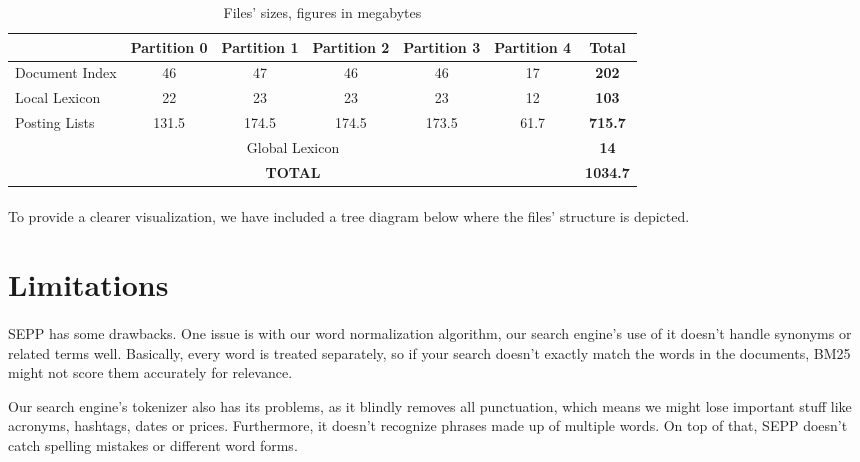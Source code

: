 \begin{table}[H]
	\centering
	\begin{tabular}{|l|*{5}{c|}c|}
		\hline
		& \textbf{Partition 0} & \textbf{Partition 1} & \textbf{Partition 2} & \textbf{Partition 3} & \textbf{Partition 4} & \textbf{Total} \\
		\hline
		Document Index & 46 & 47 & 46 & 46 & 17 & \textbf{202} \\
		Local Lexicon & 22 & 23 & 23 & 23 & 12 & \textbf{103} \\
		Posting Lists & 131.5 & 174.5 & 174.5 & 173.5 & 61.7 & \textbf{715.7} \\
		\hline
		\multicolumn{6}{|c|}{Global Lexicon} & \textbf{14} \\
		\hline
		\multicolumn{6}{|c|}{\textbf{TOTAL}} & \textbf{1034.7} \\
		\hline
	\end{tabular}
	\caption{Files' sizes, figures in megabytes}
	\label{tab:spanning_table}
\end{table}

\paragraph{}
To provide a clearer visualization, we have included a tree diagram below where the files' structure is depicted.




\section{Limitations}
\paragraph{}
SEPP has some drawbacks. One issue is with our word normalization algorithm, our search engine's use of it doesn't handle synonyms or related terms well. Basically, every word is treated separately, so if your search doesn't exactly match the words in the documents, BM25 might not score them accurately for relevance.

Our search engine's tokenizer also has its problems, as it blindly removes all punctuation, which means we might lose important stuff like acronyms, hashtags, dates or prices. Furthermore, it doesn't recognize phrases made up of multiple words. On top of that, SEPP doesn't catch spelling mistakes or different word forms.


